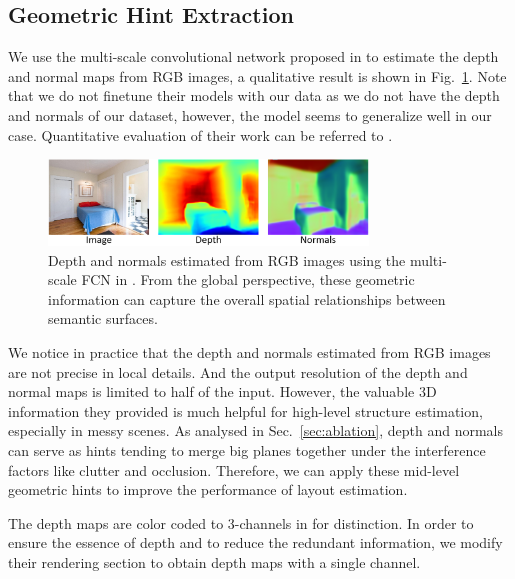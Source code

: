\subsection{Geometric Hint Extraction}
\label{sec:depth_normal}

We use the multi-scale convolutional network proposed in \cite{eigen2015predicting} to estimate the depth and normal maps from RGB images, a qualitative result is shown in Fig.~\ref{fig:depthandnormal}. Note that we do not finetune their models with our data as we do not have the depth and normals of our dataset, however, the model seems to generalize well in our case. Quantitative evaluation of their work can be referred to \cite{eigen2015predicting}.
%

\begin{figure}
	\centering
	\includegraphics[width=8.5cm]{figure/DN.png}
	\caption{Depth and normals estimated from RGB images using the multi-scale FCN in \cite{eigen2015predicting}. From the global perspective, these geometric information can capture the overall spatial relationships between semantic surfaces. }
	\label{fig:depthandnormal}
\end{figure}

We notice in practice that the depth and normals estimated from RGB images are not precise in local details. And the output resolution of the depth and normal maps is limited to half of the input. However, the valuable 3D information they provided is much helpful for high-level structure estimation, especially in messy scenes.  
%
As analysed in Sec.~\ref{sec:ablation}, depth and normals can serve as hints tending to merge big planes together under the interference factors like clutter and occlusion. 
%
Therefore, we can apply these mid-level geometric hints to improve the performance of layout estimation. 
%


The depth maps are color coded to 3-channels in \cite{eigen2015predicting} for distinction. In order to ensure the essence of depth and to reduce the redundant information, we modify their rendering section to obtain depth maps with a single channel.

